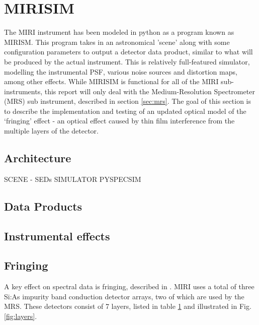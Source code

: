  \cite{Lahuis2018} %
\section{MIRISIM}
\cite{Consortium2018} %
\cite{Cossou2019} %
The MIRI instrument has been modeled in python as a program known as MIRISM. 
This program takes in an astronomical 'scene' along with some configuration parameters to output a detector data product, similar to what will be produced by the actual instrument.
This is relatively full-featured simulator, modelling the instrumental PSF, various noise sources and distortion maps, among other effects.
While MIRISIM is functional for all of the MIRI sub-instruments, this report will only deal with the Medium-Resolution Spectrometer (MRS) sub instrument, described in section \ref{sec:mrs}.
The goal of this section is to describe the implementation and testing of an updated optical model of the `fringing' effect - an optical effect caused by thin film interference from the multiple layers of the detector.
\subsection{Architecture}
SCENE - SEDs
SIMULATOR
PYSPECSIM
\subsection{Data Products}
\begin{figure}
	\caption{\label{fig:fringeflat}}
\end{figure}
\subsection{Instrumental effects}
\subsection{Fringing}
\cite{Lahuis2003} %
\cite{VanderPlas2018} %
A key effect on spectral data is fringing, described in \cite{ref:Argyriou2018}. 
MIRI uses a total of three Si:As impurity band conduction detector arrays, two of which are used by the MRS. 
These detectors consist of 7 layers, listed in table \ref{tab:layers} and illustrated in Fig. \ref{fig:layers}.
\begin{table}
	\begin{tabular}{llll}
	\end{tabular}
	\caption{\label{tab:layers}}
\end{table}




